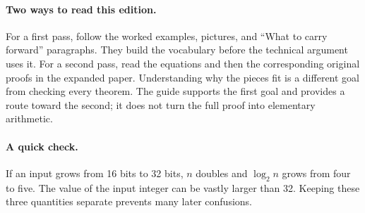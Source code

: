 
\paragraph{Two ways to read this edition.}
For a first pass, follow the worked examples, pictures, and ``What to carry
forward'' paragraphs. They build the vocabulary before the technical argument
uses it. For a second pass, read the equations and then the corresponding
original proofs in the expanded paper. Understanding why the pieces fit is a
different goal from checking every theorem. The guide supports the first goal
and provides a route toward the second; it does not turn the full proof into
elementary arithmetic.

\paragraph{A quick check.}
If an input grows from 16 bits to 32 bits, $n$ doubles and $\log_2 n$ grows
from four to five. The value of the input integer can be vastly larger than 32.
Keeping these three quantities separate prevents many later confusions.

